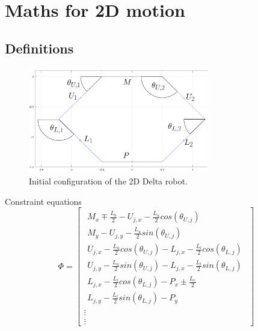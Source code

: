 \section{Maths for 2D motion}
\subsection{Definitions}
\begin{figure}[h!]
	\centering
	\includegraphics[width=0.7\textwidth]{figures/Initial_2D.png}                                                              
	\caption[Initial configuration of the 2D Delta robot]{Initial configuration of the 2D Delta robot.}
	\label{fig:initial2D}
\end{figure}

Constraint equations
\begin{equation}
    \Phi=
    \begin{bmatrix}
    \begin{array}{l} %
    M_x\mp\frac{L_b}{2}-U_{j,x}-\frac{L_u}{2} cos(\theta_{U,j}) \\
    M_y-U_{j,y}-\frac{L_u}{2} sin(\theta_{U,j})\\
    U_{j,x}-\frac{L_u}{2}cos(\theta_{U,j})-L_{j,x}-\frac{L_l}{2}cos(\theta_{L,j}) \\
    U_{j,y}-\frac{L_u}{2}sin(\theta_{U,j})-L_{j,x}-\frac{L_l}{2}sin(\theta_{L,j})\\
    L_{j,x}-\frac{L_l}{2}cos(\theta_{L,j})-P_x \pm \frac{L_e}{2} \\
    L_{j,y}-\frac{L_l}{2}sin(\theta_{L,j})-P_y%
    \end{array}\\
    \vdots \\
    \vdots
    \end{bmatrix}
    \label{eq:Phi2D}
\end{equation}

